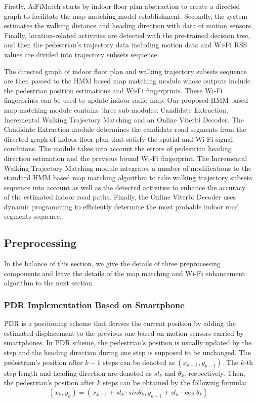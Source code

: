 \documentclass[conference]{IEEEtran}
\begin{document}
Firstly, AiFiMatch starts by indoor floor plan abstraction to create a directed graph to facilitate the map matching model establishment. Secondly, the system estimates the walking distance and heading direction with data of motion sensors. Finally, location-related activities are detected with the pre-trained decision tree, and then the pedestrian's trajectory data including motion data and Wi-Fi RSS values are divided into trajectory subsets sequence.  

The directed graph of indoor floor plan and walking trajectory subsets sequence are then passed to the HMM based map matching module whose outputs include the pedestrian position estimations and Wi-Fi fingerprints. These Wi-Fi fingerprints can be used to update indoor radio map. Our proposed HMM based map matching module contains three sub-modules: Candidate Extraction, Incremental Walking Trajectory Matching and an Online Viterbi Decoder. The Candidate Extraction module determines the candidate road segments from the directed graph of indoor floor plan that satisfy the spatial and Wi-Fi signal conditions. The module takes into account the errors of pedestrian heading direction estimation and the previous bound Wi-Fi fingerprint. The Incremental Walking Trajectory Matching module integrates a number of modifications to the standard HMM based map matching algorithm to take walking trajectory subsets sequence into account as well as the detected activities to enhance the accuracy of the estimated indoor road paths. Finally, the Online Viterbi Decoder uses dynamic programming to efficiently determine the most probable indoor road segments sequence.

\subsection{Preprocessing}

In the balance of this section, we give the details of three preprocessing components and leave the details of the map matching and Wi-Fi enhancement algorithm to the next section.

\subsubsection{PDR Implementation Based on Smartphone}

PDR is a positioning scheme that derives the current position by adding the estimated displacement to the previous one based on motion sensors carried by smartphones. In PDR scheme, the pedestrian's position is usually updated by the step and the heading direction during one step is supposed to be unchanged. The pedestrian's position after $k-1$ steps can be denoted as $(x_{k-1},y_{k-1})$. The $k$-th step length and heading direction are denoted as $sl_k$ and $\theta_k$, respectively. Then, the pedestrian's position after $k$ steps can be obtained by the following formula:
\begin{equation}
	\label{equ_pdr}
	({x_k},{y_k}) = ({x_{k - 1}} + s{l_k} \cdot sin{\theta _k},{y_{k - 1}} + s{l_k} \cdot \cos {\theta _k})
\end{equation}
\end{document}
